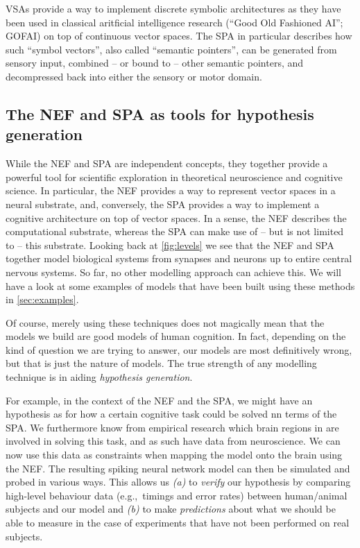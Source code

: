 \documentclass[10pt,letterpaper,oneside]{article}
\begin{document}
VSAs provide a way to implement discrete symbolic architectures as they have been used in classical aritficial intelligence research (\enquote{Good Old Fashioned AI}; GOFAI) on top of continuous vector spaces. The SPA in particular describes how such \enquote{symbol vectors}, also called \enquote{semantic pointers}, can be generated from sensory input, combined -- or bound to -- other semantic pointers, and decompressed back into either the sensory or motor domain.

\subsection{The NEF and SPA as tools for hypothesis generation}
While the NEF and SPA are independent concepts, they together provide a powerful tool for scientific exploration in theoretical neuroscience and cognitive science. In particular, the NEF provides a way to represent vector spaces in a neural substrate, and, conversely, the SPA provides a way to implement a cognitive architecture on top of vector spaces. In a sense, the NEF describes the computational substrate, whereas the SPA can make use of -- but is not limited to -- this substrate. Looking back at \cref{fig:levels} we see that the NEF and SPA together model biological systems from synapses and neurons up to entire central nervous systems. So far, no other modelling approach can achieve this. We will have a look at some examples of models that have been built using these methods in \cref{sec:examples}.

Of course, merely using these techniques does not magically mean that the models we build are good models of human cognition. In fact, depending on the kind of question we are trying to answer, our models are most definitively wrong, but that is just the nature of models. The true strength of any modelling technique is in aiding \emph{hypothesis generation}.

For example, in the context of the NEF and the SPA, we might have an hypothesis as for how a certain cognitive task could be solved nn terms of the SPA. We furthermore know from empirical research which brain regions in are involved in solving this task, and as such have data from neuroscience. We can now use this data as constraints when mapping the model onto the brain using the NEF. The resulting spiking neural network model can then be simulated and probed in various ways. This allows us \emph{(a)} to \emph{verify} our hypothesis by comparing high-level behaviour data (e.g.,~timings and error rates) between human/animal subjects and our model and \emph{(b)} to make \emph{predictions} about what we should be able to measure in the case of experiments that have not been performed on real subjects.
\end{document}
